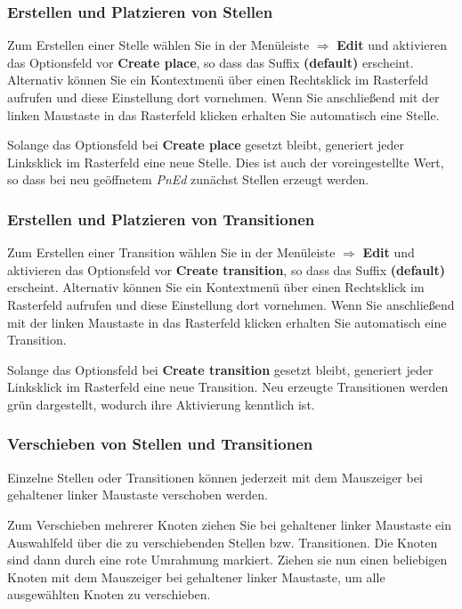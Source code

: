 \documentclass[11pt]{article}
\begin{document}
\subsubsection{Erstellen und Platzieren von Stellen}
\label{sec-2-2-1}

    Zum Erstellen einer Stelle wählen Sie in der Menüleiste
    $\Rightarrow$ \textbf{Edit} und aktivieren das Optionsfeld vor \textbf{Create     place}, so dass das Suffix \textbf{(default)} erscheint. Alternativ
    können Sie ein Kontextmenü über einen Rechtsklick im Rasterfeld
    aufrufen und diese Einstellung dort vornehmen. Wenn Sie
    anschließend mit der linken Maustaste in das Rasterfeld klicken
    erhalten Sie automatisch eine Stelle. 

    Solange das Optionsfeld bei \textbf{Create place} gesetzt bleibt,
    generiert jeder Linksklick im Rasterfeld eine neue Stelle. Dies
    ist auch der voreingestellte Wert, so dass bei neu geöffnetem
    \emph{PnEd} zunächst Stellen erzeugt werden.
\subsubsection{Erstellen und Platzieren von Transitionen}
\label{sec-2-2-2}

    Zum Erstellen einer Transition wählen Sie in der Menüleiste
    $\Rightarrow$ \textbf{Edit} und aktivieren das Optionsfeld vor \textbf{Create     transition}, so dass das Suffix \textbf{(default)} erscheint. Alternativ
    können Sie ein Kontextmenü über einen Rechtsklick im Rasterfeld
    aufrufen und diese Einstellung dort vornehmen. Wenn Sie
    anschließend mit der linken Maustaste in das Rasterfeld klicken
    erhalten Sie automatisch eine Transition.

    Solange das Optionsfeld bei \textbf{Create transition} gesetzt bleibt,
    generiert jeder Linksklick im Rasterfeld eine neue Transition.
    Neu erzeugte Transitionen werden grün dargestellt, wodurch ihre
    Aktivierung kenntlich ist.
\subsubsection{Verschieben von Stellen und Transitionen}
\label{sec-2-2-3}

    Einzelne Stellen oder Transitionen können jederzeit mit dem
    Mauszeiger bei gehaltener linker Maustaste verschoben werden.

    Zum Verschieben mehrerer Knoten ziehen Sie bei gehaltener linker
    Maustaste ein Auswahlfeld über die zu verschiebenden Stellen
    bzw. Transitionen. Die Knoten sind dann durch eine rote Umrahmung
    markiert. Ziehen sie nun einen beliebigen Knoten mit dem
    Mauszeiger bei gehaltener linker Maustaste, um alle ausgewählten
    Knoten zu verschieben.
\end{document}

